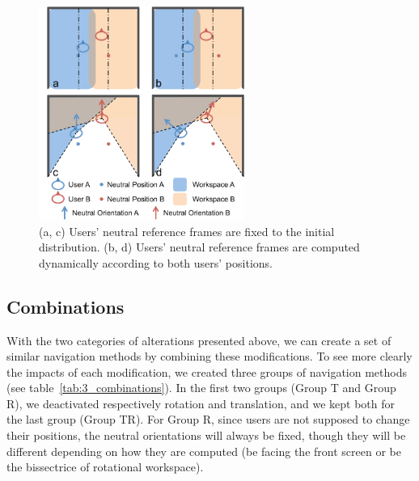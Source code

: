 \begin{figure}[tb]
  \centering
  \includegraphics[width=0.6\textwidth]{figures/3_neutral_ref}
  \caption{\label{fig:3_neutral_ref}(a, c) Users' neutral reference frames are fixed to the initial distribution. (b, d) Users' neutral reference frames are computed dynamically according to both users' positions.}
\end{figure}

\subsection{Combinations}
With the two categories of alterations presented above, we can create a set of similar navigation methods by combining these modifications. To see more clearly the impacts of each modification, we created three groups of navigation methods (see table~\ref{tab:3_combinations}). In the first two groups (Group T and Group R), we deactivated respectively rotation and translation, and we kept both for the last group (Group TR). For Group R, since users are not supposed to change their positions, the neutral orientations will always be fixed, though they will be different depending on how they are computed (be facing the front screen or be the bissectrice of rotational workspace).

